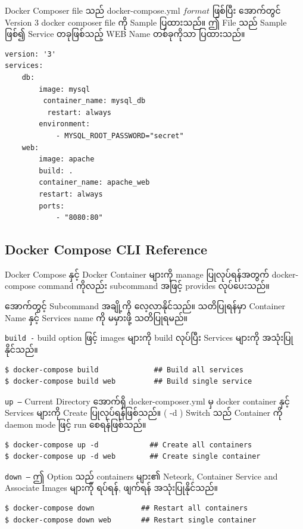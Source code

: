 \documentclass{article}
\begin{document}
Docker Composer file သည် docker-compose.yml $format$ ဖြစ်ပြီး အောက်တွင်
Version 3 docker composer file ကို Sample ပြထားသည်။ ဤ File သည် Sample
ဖြစ်၍ Service တခုဖြစ်သည့် WEB Name တစ်ခုကိုသာ ပြထားသည်။

\begin{verbatim}
version: '3'
services:
    db:
        image: mysql
         container_name: mysql_db
          restart: always
        environment:
            - MYSQL_ROOT_PASSWORD="secret"
    web:
        image: apache
        build: .
        container_name: apache_web
        restart: always
        ports:
            - "8080:80"
\end{verbatim}

\subsection{Docker Compose CLI
Reference}\label{docker-compose-cli-reference}

Docker Compose နှင့် Docker Container များကို manage ပြုလုပ်ရန်အတွက်
docker-compose command ကိုလည်း subcommand အဖြင့် provides လုပ်ပေးသည်။

အောက်တွင့် Subcommand အချို့ကို လေ့လာနိုင်သည်။ သတိပြုရန်မှာ Container
Name နှင့် Services name ကို မမှားဖို့ သတိပြုရမည်။

\texttt{build -} build option ဖြင့် images များကို build လုပ်ပြီး
Services များကို အသုံးပြုနိုင်သည်။

\begin{verbatim}
$ docker-compose build             ## Build all services
$ docker-compose build web         ## Build single service
\end{verbatim}

\texttt{up –} Current Directory အောက်ရှိ docker-composer.yml မှ docker
container နှင့် Services များကို Create ပြုလုပ်ရန်ဖြစ်သည်။ ( -d ) Switch
သည် Container ကို daemon mode ဖြင့် run စေရန်ဖြစ်သည်။

\begin{verbatim}
$ docker-compose up -d            ## Create all containers
$ docker-compose up -d web        ## Create single container
\end{verbatim}

\texttt{down –} ဤ Option သည် containers များ၏ Neteork, Container Service
and Associate Images များကို ရပ်ရန်, ဖျက်ရန် အသုံးပြုနိုင်သည်။

\begin{verbatim}
$ docker-compose down           ## Restart all containers
$ docker-compose down web       ## Restart single container
\end{verbatim}
\end{document}
